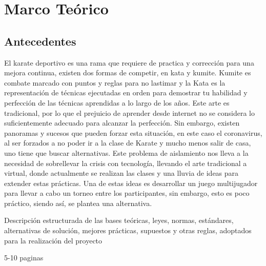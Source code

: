 \chapter{Marco Teórico}

\section{Antecedentes}

	El karate deportivo es una rama que requiere de practica y corrección para una mejora continua, existen dos formas de competir, en kata y kumite.
Kumite es combate marcado con puntos y reglas para no lastimar y la Kata es la representación de técnicas ejecutadas en orden para demostrar tu habilidad y perfección de las técnicas aprendidas a lo largo de los años. 
Este arte es tradicional, por lo que el prejuicio de aprender desde internet no se considera lo suficientemente adecuado para alcanzar la perfección. Sin embargo, existen panoramas y sucesos que pueden forzar esta situación, en este caso el coronavirus, al ser forzados a no poder ir a la clase de Karate y mucho menos salir de casa, uno tiene que buscar alternativas.
Este problema de aislamiento nos lleva a la necesidad de sobrellevar la crisis con tecnología, llevando el arte tradicional a virtual, donde actualmente se realizan las clases y una lluvia de ideas para extender estas prácticas. Una de estas ideas es desarrollar un juego multijugador para llevar a cabo un torneo entre los participantes, sin embargo, esto es poco práctico, siendo así, se plantea una alternativa.



Descripción estructurada de las bases teóricas,
leyes, normas, estándares, alternativas de solución,
mejores prácticas, supuestos y otras reglas,
adoptados para la realización del proyecto

5-10 paginas
